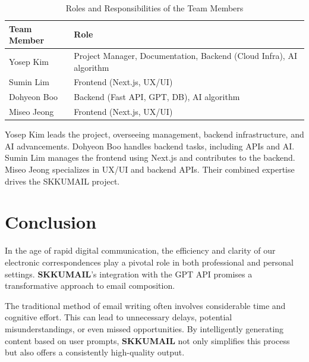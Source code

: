 \begin{table}[ht]
	\centering
	\begin{tabularx}{\textwidth}{|X|X|}
		\hline
		\rowcolor{gray!30}
		Team Member & Role                                                                \\
		\hline
		Yosep Kim   & Project Manager, Documentation, Backend (Cloud Infra), AI algorithm \\
		\hline
		Sumin Lim   & Frontend (Next.js, UX/UI)                                           \\
		\hline
		Dohyeon Boo & Backend (Fast API, GPT, DB), AI algorithm                           \\
		
		\hline
		Miseo Jeong & Frontend (Next.js, UX/UI)                                           \\
		\hline
	\end{tabularx}
	\caption{Roles and Responsibilities of the Team Members}
\end{table}

Yosep Kim leads the project, overseeing management, backend infrastructure, and AI advancements. Dohyeon Boo handles backend tasks, including APIs and AI. Sumin Lim manages the frontend using Next.js and contributes to the backend. Miseo Jeong specializes in UX/UI and backend APIs. Their combined expertise drives the SKKUMAIL project.

\titleformat{\section}[block]{\normalfont\Large\bfseries\color{darkblue}}{\thesection}{1em}{}

\section*{Conclusion}

In the age of rapid digital communication, the efficiency and clarity of our electronic correspondences play a pivotal role in both professional and personal settings. \textbf{SKKUMAIL}'s integration with the GPT API promises a transformative approach to email composition.

The traditional method of email writing often involves considerable time and cognitive effort. This can lead to unnecessary delays, potential misunderstandings, or even missed opportunities. By intelligently generating content based on user prompts, \textbf{SKKUMAIL} not only simplifies this process but also offers a consistently high-quality output.

